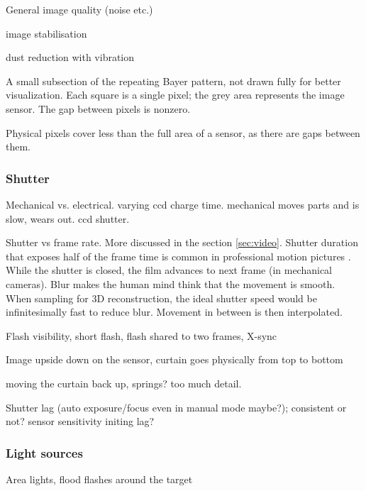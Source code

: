 General image quality (noise etc.)

image stabilisation

dust reduction with vibration


{A small subsection of the repeating Bayer pattern, not drawn fully for better visualization. Each square is a single pixel; the grey area represents the image sensor. The gap between pixels is nonzero.}

Physical pixels cover less than the full area of a sensor, as there are gaps between them.


\subsubsection{Shutter} %

Mechanical vs. electrical. varying ccd charge time. mechanical moves parts and is slow, wears out. ccd shutter.

Shutter vs frame rate. More discussed in the section \ref{sec:video}. Shutter duration that exposes half of the frame time is common in professional motion pictures \cite{wilson2004anton}. While the shutter is closed, the film advances to next frame (in mechanical cameras). Blur makes the human mind think that the movement is smooth. When sampling for 3D reconstruction, the ideal shutter speed would be infinitesimally fast to reduce blur. Movement in between is then interpolated.

Flash visibility, short flash, flash shared to two frames, X-sync

Image upside down on the sensor, curtain goes physically from top to bottom

moving the curtain back up, springs? too much detail.

Shutter lag (auto exposure/focus even in manual mode maybe?); consistent or not? sensor sensitivity initing lag?


\subsubsection{Light sources}

Area lights, flood flashes around the target

